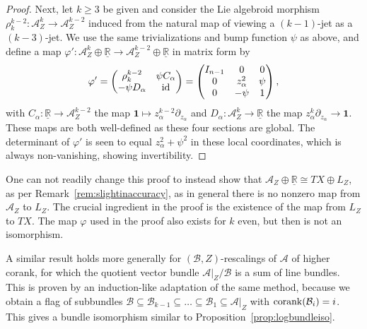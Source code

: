 \documentclass[pdftex]{sigma}
\numberwithin{equation}{section}
\begin{document}
\begin{proof}
Next, let $k \geq 3$ be given and consider the Lie algebroid morphism $\rho_k^{k-2} \colon \mathcal{A}_Z^k \to \mathcal{A}_Z^{k-2}$ induced from the natural map of viewing a $(k-1)$-jet as a $(k-3)$-jet. We use the same trivializations and bump function $\psi$ as above, and define a map $\varphi'\colon \mathcal{A}_Z^k \oplus \underline{\mathbb{R}} \to \mathcal{A}_Z^{k-2} \oplus \underline{\mathbb{R}}$ in matrix form by
\begin{displaymath}
	\varphi' = \begin{pmatrix} \rho_k^{k-2} & \psi C_\alpha \\ -\psi D_\alpha & {\rm id} \end{pmatrix} = \begin{pmatrix} I_{n-1} & 0 & 0 \\ 0 & z_\alpha^2 & \psi \\ 0 & -\psi & 1 \end{pmatrix},
\end{displaymath}
with $C_\alpha\colon \underline{\mathbb{R}} \to \mathcal{A}_Z^{k-2}$ the map $\mathbf{1} \mapsto z_\alpha^{k-2} \partial_{z_\alpha}$ and $D_\alpha\colon \mathcal{A}_Z^k \to \underline{\mathbb{R}}$ the map $z_\alpha^k \partial_{z_\alpha} \to \mathbf{1}$. These maps are both well-defined as these four sections are global. The determinant of $\varphi'$ is seen to equal $z_\alpha^2 + \psi^2$ in these local coordinates, which is always non-vanishing, showing invertibility.
\end{proof}

\begin{Remark} One can not readily change this proof to instead show that $\mathcal{A}_Z \oplus \underline{\mathbb{R}} \cong TX \oplus L_Z$, as per Remark~\ref{rem:slightinaccuracy}, as in general there is no nonzero map from $\mathcal{A}_Z$ to $L_Z$. The crucial ingredient in the proof is the existence of the map from $L_Z$ to $TX$. The map $\varphi$ used in the proof also exists for $k$ even, but then is not an isomorphism.
\end{Remark}

A similar result holds more generally for $(\mathcal{B},Z)$-rescalings of $\mathcal{A}$ of higher corank, for which the quotient vector bundle $\mathcal{A}|_Z/\mathcal{B}$ is a sum of line bundles. This is proven by an induction-like adaptation of the same method, because we obtain a flag of subbundles $\mathcal{B} \subseteq \mathcal{B}_{k-1} \subseteq \dots \subseteq \mathcal{B}_1 \subseteq \mathcal{A}|_Z$ with ${\rm corank}(\mathcal{B}_i) = i$. This gives a bundle isomorphism similar to Proposition~\ref{prop:logbundleiso}.
\end{document}
